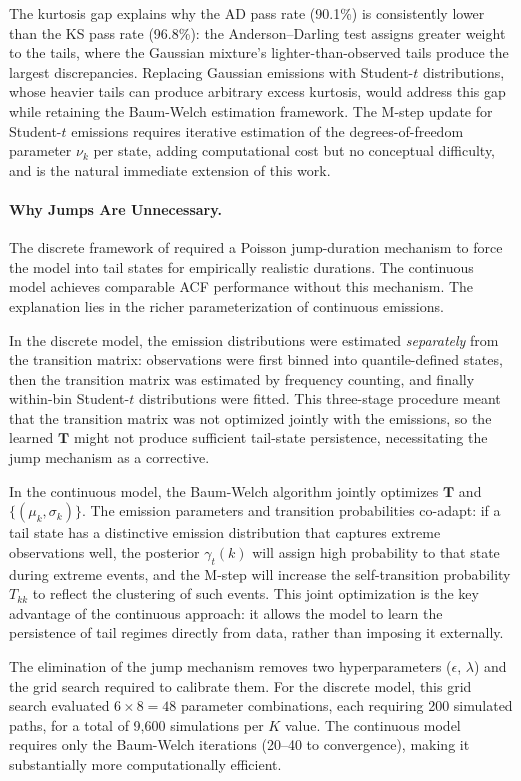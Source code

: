 The kurtosis gap explains why the AD pass rate (90.1\%) is consistently lower than the KS pass rate (96.8\%): the Anderson--Darling test assigns greater weight to the tails, where the Gaussian mixture's lighter-than-observed tails produce the largest discrepancies.
Replacing Gaussian emissions with Student-$t$ distributions, whose heavier tails can produce arbitrary excess kurtosis, would address this gap while retaining the Baum-Welch estimation framework.
The M-step update for Student-$t$ emissions requires iterative estimation of the degrees-of-freedom parameter $\nu_k$ per state, adding computational cost but no conceptual difficulty, and is the natural immediate extension of this work.

\paragraph{Why Jumps Are Unnecessary.}
The discrete framework of \citet{alswaidan2026hybrid} required a Poisson jump-duration mechanism to force the model into tail states for empirically realistic durations.
The continuous model achieves comparable ACF performance without this mechanism.
The explanation lies in the richer parameterization of continuous emissions.

In the discrete model, the emission distributions were estimated \emph{separately} from the transition matrix: observations were first binned into quantile-defined states, then the transition matrix was estimated by frequency counting, and finally within-bin Student-$t$ distributions were fitted.
This three-stage procedure meant that the transition matrix was not optimized jointly with the emissions, so the learned $\mathbf{T}$ might not produce sufficient tail-state persistence, necessitating the jump mechanism as a corrective.

In the continuous model, the Baum-Welch algorithm jointly optimizes $\mathbf{T}$ and $\{(\mu_k, \sigma_k)\}$.
The emission parameters and transition probabilities co-adapt: if a tail state has a distinctive emission distribution that captures extreme observations well, the posterior $\gamma_t(k)$ will assign high probability to that state during extreme events, and the M-step will increase the self-transition probability $T_{kk}$ to reflect the clustering of such events.
This joint optimization is the key advantage of the continuous approach: it allows the model to learn the persistence of tail regimes directly from data, rather than imposing it externally.

The elimination of the jump mechanism removes two hyperparameters ($\epsilon$, $\lambda$) and the grid search required to calibrate them.
For the discrete model, this grid search evaluated $6 \times 8 = 48$ parameter combinations, each requiring 200 simulated paths, for a total of 9{,}600 simulations per $K$ value.
The continuous model requires only the Baum-Welch iterations (20--40 to convergence), making it substantially more computationally efficient.

